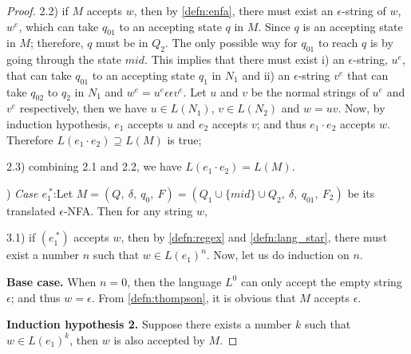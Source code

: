 \begin{proof}
\par 2.2) if \(M\) accepts \(w\), then by \autoref{defn:enfa}, there must
exist an \(\epsilon\)-string of \(w\), \(w^e\), which can take
\(q_{01}\) to an accepting state \(q\) in \(M\). Since \(q\) is an
accepting state in \(M\); therefore, \(q\) must be in \(Q_2\). The only possible way for
\(q_{01}\) to reach \(q\) is by going through the state \(mid\). This
implies that there must exist i) an \(\epsilon\)-string, \(u^e\), that can take
\(q_{01}\) to an accepting state \(q_1\) in \(N_1\) and ii) an
\(\epsilon\)-string \(v^e\) that can take \(q_{02}\) to \(q_2\) in
\(N_1\) and \(w^e = u^e\epsilon\epsilon v^e\). Let \(u\) and \(v\) be the normal strings of \(u^e\) and
\(v^e\) respectively, then we have \(u \in L(N_1)\), \(v \in L(N_2)\) and \(w = uv\). Now, by induction
hypothesis, \(e_1\) accepts \(u\) and \(e_2\) accepts \(v\); and thus
\(e_1 \cdot e_2\) accepts \(w\). Therefore \(L(e_1 \cdot e_2) \supseteq L(M)\) is true; 

\par 2.3) combining 2.1 and 2.2, we have \(L(e_1 \cdot e_2) = L(M)\). 

\par {}) \textit{Case \(e_1^{\ *}\)}:\quad Let \(M = (Q,\ \delta,\ q_0,\
F) = (Q_1 \cup \{mid\} \cup Q_2,\ \delta,\ q_{01},\ F_2)\) be its
translated \(\epsilon\)-NFA. Then for any string \(w\), 

\par 3.1) if \((e_1^{\ *})\) accepts \(w\), then by \autoref{defn:regex}
and \autoref{defn:lang_star}, there must exist a number \(n\) such
that \(w \in L(e_1)^n\). Now, let us do induction on \(n\). 

\par \quad \textbf{Base case.} \quad When \(n = 0\), then the language
\(L^0\) can only accept the empty string \(\epsilon\); and thus \(w =
\epsilon\). From \autoref{defn:thompson}, it is obvious that \(M\)
accepts \(\epsilon\). 

\par \quad \textbf{Induction hypothesis 2.} \quad Suppose there exists a number \(k\) such that \(w
\in L(e_1)^k\), then \(w\) is also accepted by \(M\). 


\end{proof}
